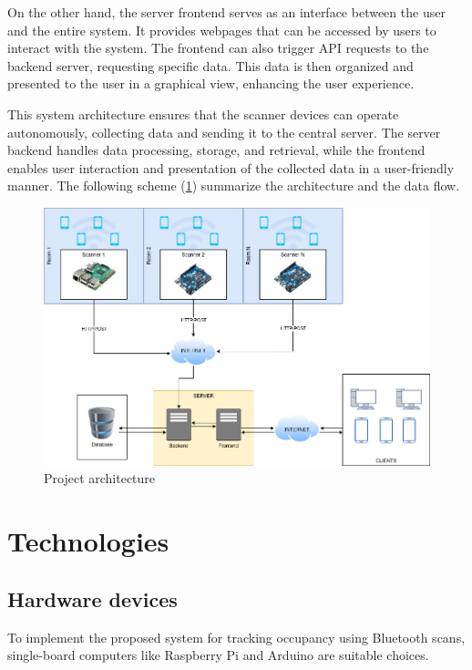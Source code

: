 \documentclass[a4paper, 11pt]{article}
\begin{document}
On the other hand, the server frontend serves as an interface between the user and the entire system. It provides webpages that can be accessed by users to interact with the system. The frontend can also trigger API requests to the backend server, requesting specific data. This data is then organized and presented to the user in a graphical view, enhancing the user experience.

This system architecture ensures that the scanner devices can operate autonomously, collecting data and sending it to the central server. The server backend handles data processing, storage, and retrieval, while the frontend enables user interaction and presentation of the collected data in a user-friendly manner. The following scheme (\ref{fig:system-architecture}) summarize the architecture and the data flow.

\begin{figure}
    \centering
    \includegraphics[width=1\linewidth]{images/WNMA-ProjectScheme.jpg}
    \caption{Project architecture}
    \label{fig:system-architecture}
\end{figure}


\section{Technologies}
\subsection{Hardware devices}
To implement the proposed system for tracking occupancy using Bluetooth scans, single-board computers like Raspberry Pi \cite{RPI} and Arduino \cite{arduino} are suitable choices. 
\end{document}
